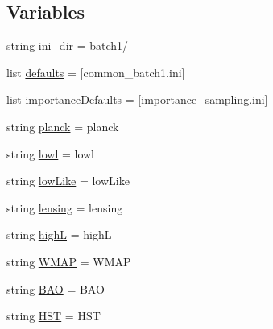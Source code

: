 \subsection*{Variables}
\begin{DoxyCompactItemize}
\item 
string \mbox{\hyperlink{namespaceplanck_1_1settings__planck__nominal_abdc75ce6834318d23fde797a43e6f0a9}{ini\+\_\+dir}} = \textquotesingle{}batch1/\textquotesingle{}
\item 
list \mbox{\hyperlink{namespaceplanck_1_1settings__planck__nominal_a399e2f6a512421472b6c024febb9128e}{defaults}} = \mbox{[}\textquotesingle{}common\+\_\+batch1.\+ini\textquotesingle{}\mbox{]}
\item 
list \mbox{\hyperlink{namespaceplanck_1_1settings__planck__nominal_a0aa7cc5feb2924cf211e82bf97399025}{importance\+Defaults}} = \mbox{[}\textquotesingle{}importance\+\_\+sampling.\+ini\textquotesingle{}\mbox{]}
\item 
string \mbox{\hyperlink{namespaceplanck_1_1settings__planck__nominal_a6f1ef8e232b47d87b6d83ec17c539b60}{planck}} = \textquotesingle{}planck\textquotesingle{}
\item 
string \mbox{\hyperlink{namespaceplanck_1_1settings__planck__nominal_ad04222a8b97633aad278ce11ad27993e}{lowl}} = \textquotesingle{}lowl\textquotesingle{}
\item 
string \mbox{\hyperlink{namespaceplanck_1_1settings__planck__nominal_a68ceaa201b9747d89c2fc510f421f4e8}{low\+Like}} = \textquotesingle{}low\+Like\textquotesingle{}
\item 
string \mbox{\hyperlink{namespaceplanck_1_1settings__planck__nominal_af5d53197b39015efa5b5f44b1d8215b1}{lensing}} = \textquotesingle{}lensing\textquotesingle{}
\item 
string \mbox{\hyperlink{namespaceplanck_1_1settings__planck__nominal_a2149979f1abc79475e000b828812fafb}{highL}} = \textquotesingle{}highL\textquotesingle{}
\item 
string \mbox{\hyperlink{namespaceplanck_1_1settings__planck__nominal_a444d51e45c49b25dbc4805d799c8b552}{W\+M\+AP}} = \textquotesingle{}W\+M\+AP\textquotesingle{}
\item 
string \mbox{\hyperlink{namespaceplanck_1_1settings__planck__nominal_adb348a01bf054af06b580f1735df8de2}{B\+AO}} = \textquotesingle{}B\+AO\textquotesingle{}
\item 
string \mbox{\hyperlink{namespaceplanck_1_1settings__planck__nominal_a0a9ee49b7e265201d4d045005f10c8ff}{H\+ST}} = \textquotesingle{}H\+ST\textquotesingle{}

\end{DoxyCompactItemize}
